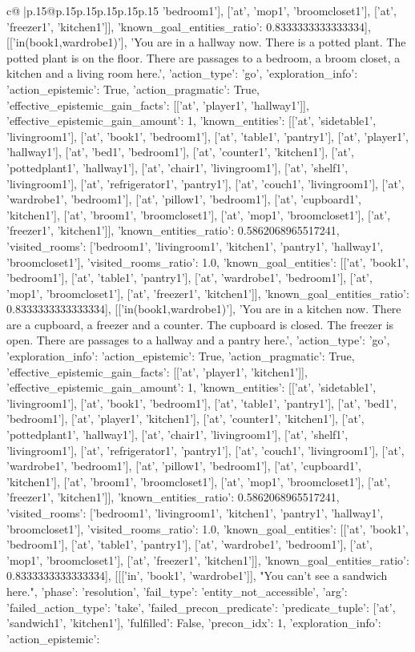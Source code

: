 \documentclass{article}
\begin{document}
{\begin{supertabular}{c@{$\;$}|p{.15\linewidth}@{}p{.15\linewidth}p{.15\linewidth}p{.15\linewidth}p{.15\linewidth}p{.15\linewidth}}
{{{'bedroom1'], ['at', 'mop1', 'broomcloset1'], ['at', 'freezer1', 'kitchen1']], 'known_goal_entities_ratio': 0.8333333333333334}}], [['in(book1,wardrobe1)'], 'You are in a hallway now. There is a potted plant. The potted plant is on the floor. There are passages to a bedroom, a broom closet, a kitchen and a living room here.', {'action_type': 'go', 'exploration_info': {'action_epistemic': True, 'action_pragmatic': True, 'effective_epistemic_gain_facts': [['at', 'player1', 'hallway1']], 'effective_epistemic_gain_amount': 1, 'known_entities': [['at', 'sidetable1', 'livingroom1'], ['at', 'book1', 'bedroom1'], ['at', 'table1', 'pantry1'], ['at', 'player1', 'hallway1'], ['at', 'bed1', 'bedroom1'], ['at', 'counter1', 'kitchen1'], ['at', 'pottedplant1', 'hallway1'], ['at', 'chair1', 'livingroom1'], ['at', 'shelf1', 'livingroom1'], ['at', 'refrigerator1', 'pantry1'], ['at', 'couch1', 'livingroom1'], ['at', 'wardrobe1', 'bedroom1'], ['at', 'pillow1', 'bedroom1'], ['at', 'cupboard1', 'kitchen1'], ['at', 'broom1', 'broomcloset1'], ['at', 'mop1', 'broomcloset1'], ['at', 'freezer1', 'kitchen1']], 'known_entities_ratio': 0.5862068965517241, 'visited_rooms': ['bedroom1', 'livingroom1', 'kitchen1', 'pantry1', 'hallway1', 'broomcloset1'], 'visited_rooms_ratio': 1.0, 'known_goal_entities': [['at', 'book1', 'bedroom1'], ['at', 'table1', 'pantry1'], ['at', 'wardrobe1', 'bedroom1'], ['at', 'mop1', 'broomcloset1'], ['at', 'freezer1', 'kitchen1']], 'known_goal_entities_ratio': 0.8333333333333334}}], [['in(book1,wardrobe1)'], 'You are in a kitchen now. There are a cupboard, a freezer and a counter. The cupboard is closed. The freezer is open. There are passages to a hallway and a pantry here.', {'action_type': 'go', 'exploration_info': {'action_epistemic': True, 'action_pragmatic': True, 'effective_epistemic_gain_facts': [['at', 'player1', 'kitchen1']], 'effective_epistemic_gain_amount': 1, 'known_entities': [['at', 'sidetable1', 'livingroom1'], ['at', 'book1', 'bedroom1'], ['at', 'table1', 'pantry1'], ['at', 'bed1', 'bedroom1'], ['at', 'player1', 'kitchen1'], ['at', 'counter1', 'kitchen1'], ['at', 'pottedplant1', 'hallway1'], ['at', 'chair1', 'livingroom1'], ['at', 'shelf1', 'livingroom1'], ['at', 'refrigerator1', 'pantry1'], ['at', 'couch1', 'livingroom1'], ['at', 'wardrobe1', 'bedroom1'], ['at', 'pillow1', 'bedroom1'], ['at', 'cupboard1', 'kitchen1'], ['at', 'broom1', 'broomcloset1'], ['at', 'mop1', 'broomcloset1'], ['at', 'freezer1', 'kitchen1']], 'known_entities_ratio': 0.5862068965517241, 'visited_rooms': ['bedroom1', 'livingroom1', 'kitchen1', 'pantry1', 'hallway1', 'broomcloset1'], 'visited_rooms_ratio': 1.0, 'known_goal_entities': [['at', 'book1', 'bedroom1'], ['at', 'table1', 'pantry1'], ['at', 'wardrobe1', 'bedroom1'], ['at', 'mop1', 'broomcloset1'], ['at', 'freezer1', 'kitchen1']], 'known_goal_entities_ratio': 0.8333333333333334}}], [[['in', 'book1', 'wardrobe1']], "You can't see a sandwich here.", {'phase': 'resolution', 'fail_type': 'entity_not_accessible', 'arg': {'failed_action_type': 'take', 'failed_precon_predicate': {'predicate_tuple': ['at', 'sandwich1', 'kitchen1'], 'fulfilled': False, 'precon_idx': 1}}, 'exploration_info': {'action_epistemic': }}}
\end{supertabular}}
\end{document}
